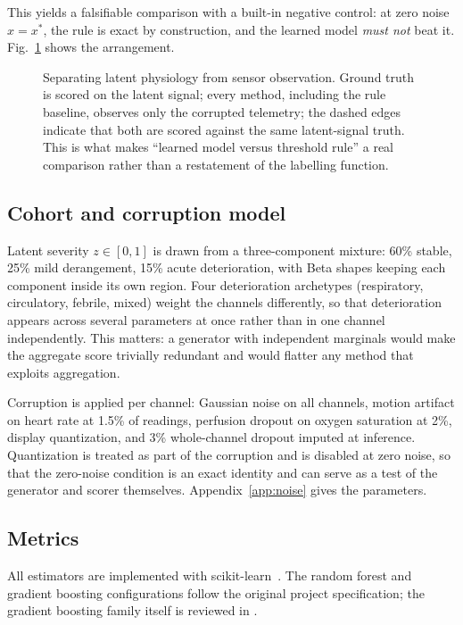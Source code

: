 \documentclass[lettersize,journal]{IEEEtran}
\begin{document}
This yields a falsifiable comparison with a built-in negative control: at zero
noise $\hat{x} = x^{*}$, the rule is exact by construction, and the learned
model \emph{must not} beat it. Fig.~\ref{fig:design} shows the arrangement.

\begin{figure}[t]
\centering

\caption{Separating latent physiology from sensor observation. Ground truth is
scored on the latent signal; every method, including the rule baseline, observes
only the corrupted telemetry; the dashed edges indicate that both are scored
against the same latent-signal truth. This is what makes ``learned model versus
threshold rule'' a real comparison rather than a restatement of the labelling
function.}
\label{fig:design}
\end{figure}

\subsection{Cohort and corruption model}

Latent severity $z \in [0,1]$ is drawn from a three-component mixture: 60\%
stable, 25\% mild derangement, 15\% acute deterioration, with Beta shapes
keeping each component inside its own region. Four deterioration archetypes
(respiratory, circulatory, febrile, mixed) weight the channels differently, so
that deterioration appears across several parameters at once rather than in one
channel independently. This matters: a generator with independent marginals
would make the aggregate score trivially redundant and would flatter any method
that exploits aggregation.

Corruption is applied per channel: Gaussian noise on all channels, motion
artifact on heart rate at 1.5\% of readings, perfusion dropout on oxygen
saturation at 2\%, display quantization, and 3\% whole-channel dropout imputed at
inference. Quantization is treated as part of the corruption and is disabled at
zero noise, so that the zero-noise condition is an exact identity and can serve
as a test of the generator and scorer themselves. Appendix~\ref{app:noise} gives
the parameters.

\subsection{Metrics}

All estimators are implemented with scikit-learn~\cite{pedregosa2011}. The
random forest \cite{breiman2001} and gradient boosting \cite{friedman2001}
configurations follow the original project specification; the gradient
boosting family itself is reviewed in \cite{natekin2013}.
\end{document}
